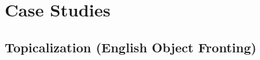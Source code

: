 \section{Case Studies}
\label{cases}
%
\subsection{Topicalization (English Object Fronting)}
\label{topsect}
%
%
%
%
%
%
%
%
%
